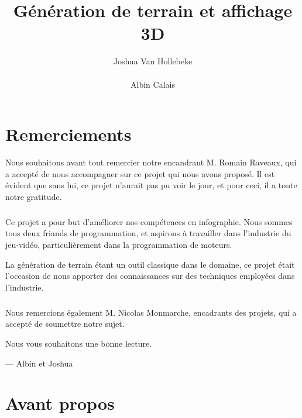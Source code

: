 \documentclass{EPUProjetDi}
\title{Génération de terrain et affichage 3D}
\author{
	Joshua Van Hollebeke\\
	\noindent[\url{joshua.van-hollebeke@etu.univ-tours.fr}]\\
	Albin Calais\\
	\noindent[\url{albin.calais@etu.univ-tours.fr}]
}
\begin{document}
\maketitle

\setcounter{page}{0}

{
\setlength{\parskip}{0em}
\tableofcontents
\listoffigures
}

\start



\chapter*{Remerciements} 

Nous souhaitons avant tout remercier notre encandrant M. Romain Raveaux, qui a accepté de nous accompagner sur ce projet qui nous avons proposé.
Il est évident que sans lui, ce projet n'aurait pas pu voir le jour, et pour ceci, il a toute notre gratitude.

\paragraph{}

Ce projet a pour but d'améliorer nos compétences en infographie. Nous sommes tous deux friands de programmation, et aspirons à travailler dans l'industrie du jeu-vidéo, particulièrement dans la programmation de moteurs.

La génération de terrain étant un outil classique dans le domaine, ce projet était l'occasion de nous apporter des connaissances sur des techniques employées dans l'industrie. 

\paragraph{}

Nous remercions également M. Nicolas Monmarche, encadrants des projets, qui a accepté de soumettre notre sujet.

\setlength\epigraphrule{0pt}

\epigraph{Nous vous souhaitons une bonne lecture.}{ --- Albin et Joshua}





\chapter*{Avant propos} 
\end{document}
